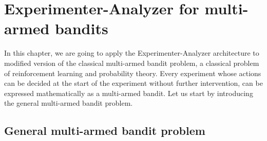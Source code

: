 \documentclass[11pt,a4paper,twoside]{report}
\newcommand{\+}{\textnormal{+} }
\theoremstyle{definition}
\numberwithin{equation}{chapter}
\begin{document}
\chapter{Experimenter-Analyzer for multi-armed bandits} 
In this chapter, we are going to apply the Experimenter-Analyzer architecture to
modified version of the classical multi-armed bandit problem, a
classical problem of reinforcement learning and probability theory. Every
experiment whose actions can be decided at the start of the experiment without
further intervention, can be expressed mathematically as a multi-armed bandit.
Let us start by introducing the general multi-armed bandit problem.
\section{General multi-armed bandit problem}
\end{document}

